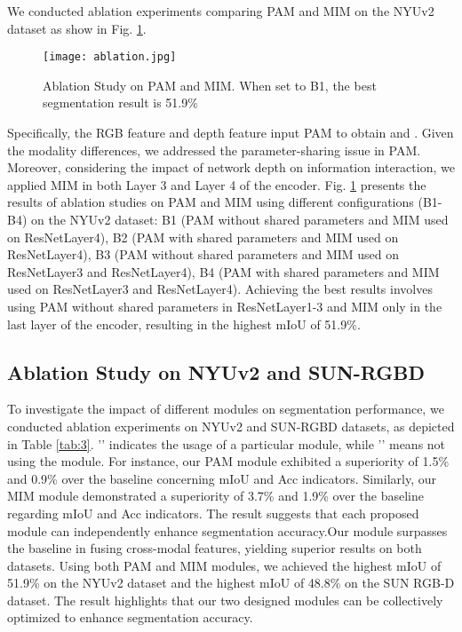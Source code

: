 \documentclass{aims}
\numberwithin{equation}{section}
\begin{document}
We conducted ablation experiments comparing PAM and MIM on the NYUv2 dataset as show in Fig. \ref{fig:Ablation}.
\begin{figure}[!htb]
	\centering
\texttt{[image: ablation.jpg]}
\caption{Ablation Study on PAM and MIM. When set to B1, the best segmentation result is 51.9\%\label{fig:Ablation}}
\end{figure}
Specifically, the RGB feature and depth feature input PAM to obtain  and . Given the modality differences, we addressed the parameter-sharing issue in PAM. Moreover, considering the impact of network depth on information interaction, we applied MIM in both Layer 3 and Layer 4 of the encoder. Fig. \ref{fig:Ablation} presents the results of ablation studies on PAM and MIM using different configurations (B1-B4) on the NYUv2 dataset: B1 (PAM without shared parameters and MIM used on ResNetLayer4), B2 (PAM with shared parameters and MIM used on ResNetLayer4), B3 (PAM without shared parameters and MIM used on ResNetLayer3 and ResNetLayer4), B4 (PAM with shared parameters and MIM used on ResNetLayer3 and ResNetLayer4). Achieving the best results involves using PAM without shared parameters in ResNetLayer1-3 and MIM only in the last layer of the encoder, resulting in the highest mIoU of 51.9\%.
\subsection{Ablation Study on NYUv2 and SUN-RGBD}
To investigate the impact of different modules on segmentation performance, we conducted ablation experiments on NYUv2 and SUN-RGBD datasets, as depicted in Table \ref{tab:3}. '' indicates the usage of a particular module, while '' means not using the module. For instance, our PAM module exhibited a superiority of 1.5\% and 0.9\% over the baseline concerning mIoU and Acc indicators. Similarly, our MIM module demonstrated a superiority of 3.7\% and 1.9\% over the baseline regarding mIoU and Acc indicators. The result suggests that each proposed module can independently enhance segmentation accuracy.Our module surpasses the baseline in fusing cross-modal features, yielding superior results on both datasets. Using both PAM and MIM modules, we achieved the highest mIoU of 51.9\% on the NYUv2 dataset and the highest mIoU of 48.8\% on the SUN RGB-D dataset. The result highlights that our two designed modules can be collectively optimized to enhance segmentation accuracy.
\end{document}
